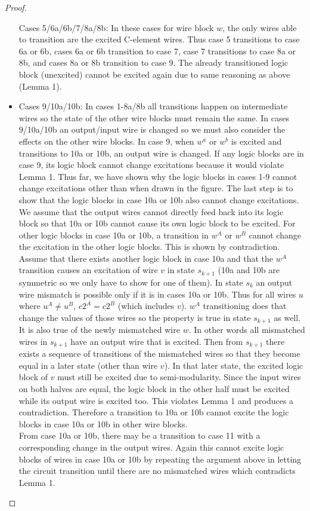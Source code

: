 \documentclass[12pt]{report}
\begin{document}
\begin{proof}
\begin{itemize}
Cases 5/6a/6b/7/8a/8b:  In these cases for wire block $w$, the only wires able to transition are the excited C-element wires.  Thus case 5 transitions to case 6a or 6b, cases 6a or 6b transition to case 7, case 7 transitions to case 8a or 8b, and cases 8a or 8b transition to case 9.  The already transitioned logic block (unexcited) cannot be excited again due to same reasoning as above (Lemma 1).
\item
Cases 9/10a/10b:  In cases 1-8a/8b all transitions happen on intermediate wires so the state of the other wire blocks must remain the same.  In cases 9/10a/10b an output/input wire is changed so we must also consider the effects on the other wire blocks.  In case 9, when $w^a$ or $w^b$ is excited and transitions to 10a or 10b, an output wire is changed.  If any logic blocks are in case 9, its logic block cannot change excitations because it would violate Lemma 1.  Thus far, we have shown why the logic blocks in cases 1-9 cannot change excitations other than when drawn in the figure.  The last step is to show that the logic blocks in case 10a or 10b also cannot change excitations.  \\  
We assume that the output wires cannot directly feed back into its logic block so that 10a or 10b cannot cause its own logic block to be excited.  For other logic blocks in case 10a or 10b, a transition in $w^A$ or $w^B$ cannot change the excitation in the other logic blocks.  This is shown by contradiction.  
Assume that there exists another logic block in case 10a and that the $w^A$ transition causes an excitation of wire $v$ in state $s_{k+1}$ (10a and 10b are symmetric so we only have to show for one of them).  In state $s_k$ an output wire mismatch is possible only if it is in cases 10a or 10b.  Thus for all wires $u$ where $u^A\neq u^B$, $c2^A=c2^B$ (which includes $v$).  $w^A$ transitioning does that change the values of those wires so the property is true in state $s_{k+1}$ as well.  It is also true of the newly mismatched wire $w$.  In other words all mismatched wires in $s_{k+1}$ have an output wire that is excited. Then from $s_{k+1}$ there exists a sequence of transitions of the mismatched wires so that they become equal in a later state (other than wire $v$).  In that later state, the excited logic block of $v$ must still be excited due to semi-modularity.  Since the input wires on both halves are equal, the logic block in the other half must be excited while its output wire is excited too.  This violates Lemma 1 and produces a contradiction.  Therefore a transition to 10a or 10b cannot excite the logic blocks in case 10a or 10b in other wire blocks.\\
From case 10a or 10b, there may be a transition to case 11 with a corresponding change in the output wires.  Again this cannot excite logic blocks of wires in case 10a or 10b by repeating the argument above in letting the circuit transition until there are no mismatched wires which contradicts Lemma 1.


\end{itemize}
\end{proof}
\end{document}
